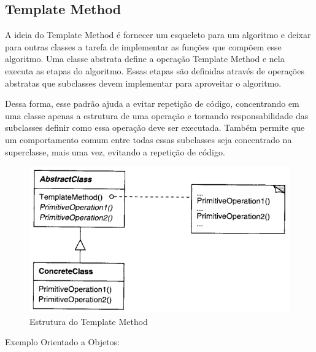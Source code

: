 \subsection{Template Method}

A ideia do Template Method é fornecer um esqueleto para um algoritmo 
e deixar para outras classes a tarefa de implementar as funções que 
compõem esse algoritmo. Uma classe abstrata define a operação Template 
Method e nela executa as etapas do algoritmo. Essas etapas são definidas 
através de operações abstratas que subclasses devem implementar para 
aproveitar o algoritmo.

Dessa forma, esse padrão ajuda a evitar repetição de código, concentrando 
em uma classe apenas a estrutura de uma operação e tornando responsabilidade 
das subclasses definir como essa operação deve ser executada. Também permite 
que um comportamento comum entre todas essas subclasses seja concentrado 
na superclasse, mais uma vez, evitando a repetição de código.

\begin{figure}[htb]
	\caption{\label{fig_grafico}Estrutura do Template Method}
	\begin{center}
	    \includegraphics[scale=0.5]{5_padroes-contexto-funcional/5.3_comportamentais/5.3.10_template-method/diagram.png}
	\end{center}
\end{figure}

Exemplo Orientado a Objetos:


